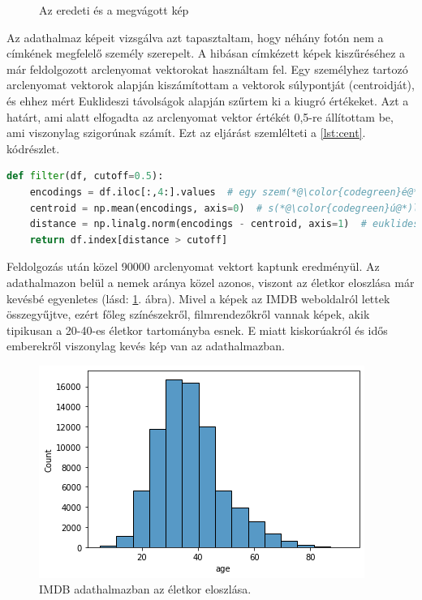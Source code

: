 \begin{figure}[ht]
\begin{subfigure}[b]{0.45\columnwidth}
     \end{subfigure}
        \caption{Az eredeti és a megvágott kép}
\end{figure}


Az adathalmaz képeit vizsgálva azt tapasztaltam, hogy néhány fotón nem a címkének megfelelő személy szerepelt. A hibásan címkézett képek kiszűréséhez a már feldolgozott arclenyomat vektorokat használtam fel. Egy személyhez tartozó arclenyomat vektorok alapján kiszámítottam a vektorok súlypontját (centroidját), és ehhez mért Euklideszi távolságok alapján szűrtem ki a kiugró értékeket. Azt a határt, ami alatt elfogadta az arclenyomat vektor értékét 0,5-re állítottam be, ami viszonylag szigorúnak számít. Ezt az eljárást szemlélteti a \ref{lst:cent}. kódrészlet.

\begin{lstlisting}[language=python, caption={Arclenyomatok szűrése távolság alapján.}, label=lst:cent]
def filter(df, cutoff=0.5):
	encodings = df.iloc[:,4:].values  # egy szem(*@\color{codegreen}é@*)lyhez tartoz(*@\color{codegreen}ó@*) arclenyomatok
	centroid = np.mean(encodings, axis=0)  # s(*@\color{codegreen}ú@*)lypont sz(*@\color{codegreen}á@*)m(*@\color{codegreen}í@*)t(*@\color{codegreen}á@*)s
	distance = np.linalg.norm(encodings - centroid, axis=1)  # euklideszi t(*@\color{codegreen}á@*)vols(*@\color{codegreen}á@*)g
	return df.index[distance > cutoff]
\end{lstlisting}

Feldolgozás után közel 90000 arclenyomat vektort kaptunk eredményül. Az adathalmazon belül a nemek aránya közel azonos, viszont az életkor eloszlása már kevésbé egyenletes (lásd: \ref{fig:agedist}. ábra). Mivel a képek az IMDB weboldalról lettek összegyűjtve, ezért főleg színészekről, filmrendezőkről vannak képek, akik tipikusan a 20-40-es életkor tartományba esnek. E miatt kiskorúakról és idős emberekről viszonylag kevés kép van az adathalmazban.

\begin{figure}[ht]
	\centering
	\includegraphics[width=0.7\columnwidth]{figures/IMDB_age_dist.png}
	\caption{IMDB adathalmazban az életkor eloszlása.}
	\label{fig:agedist}
\end{figure}

